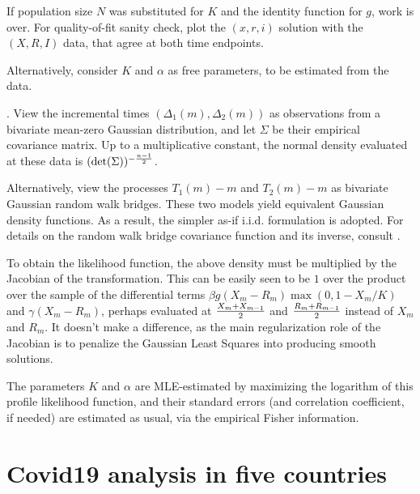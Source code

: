 \documentclass{article}
\begin{document}
\bigskip

If population size $N$ was substituted for $K$ and the identity function for $g$, work is over. For quality-of-fit sanity check, plot the $(x,r,i)$ solution with the $(X,R,I)$ data, that agree at both time endpoints.

Alternatively, consider $K$ and $\alpha$ as free parameters, to be estimated from the data.

\bigskip

. View the incremental times \linebreak $(\Delta_1(m),\Delta_2(m))$ as observations from a bivariate mean-zero Gaussian distribution, and let $\Sigma$ be their empirical covariance matrix. Up to a multiplicative constant, the normal density evaluated at these data is $(\det(\Sigma))^{-{{n-1} \over 2}}$.

Alternatively, view the processes $T_1(m)-m$ and $T_2(m)-m$ as bivariate Gaussian random walk bridges.
These two models yield equivalent Gaussian density functions. As a result, the simpler as-if i.i.d. formulation is adopted. For details on the random walk bridge covariance function and its inverse, consult \cite{Cuadras}.

To obtain the likelihood function, the above density must be multiplied by the Jacobian of the transformation. This can be easily seen to be $1$ over the product over the sample of the differential terms $\beta g(X_m-R_m)\max(0,1-X_m/K)$ and $\gamma (X_m-R_m)$, perhaps evaluated at
${{X_m+X_{m-1}} \over 2}$ and ${{R_m+R_{m-1}} \over 2}$ instead of $X_m$ and $R_m$. It doesn't make a difference, as the main regularization role of the Jacobian is to penalize the Gaussian Least Squares into producing smooth solutions.

\bigskip

The parameters $K$ and $\alpha$ are MLE-estimated by maximizing the logarithm of this profile likelihood function, and their standard errors (and correlation coefficient, if needed) are estimated as usual, via the empirical Fisher information.


\section{Covid19 analysis in five countries} \label{Covid19}
\end{document}
